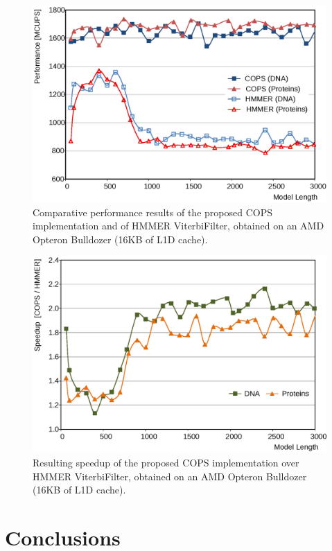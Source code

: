 \documentclass{bmcart}
\begin{document}
\begin{figure}[!b]
  \centering
  \includegraphics{img/AMD-Perf.eps} 
  \caption{Comparative performance results of the proposed COPS implementation and of HMMER ViterbiFilter, obtained on an AMD Opteron Bulldozer (16KB of L1D cache).}
  \label{runtimes-aleph}
\end{figure}

\begin{figure}[!b]
  \centering
  \includegraphics{img/AMD-speedup.eps}
  \caption{Resulting speedup of the proposed COPS implementation over HMMER ViterbiFilter, obtained on an AMD Opteron Bulldozer (16KB of L1D cache).}
  \label{speedups-aleph}
\end{figure}
 

\section*{Conclusions}
\end{document}
